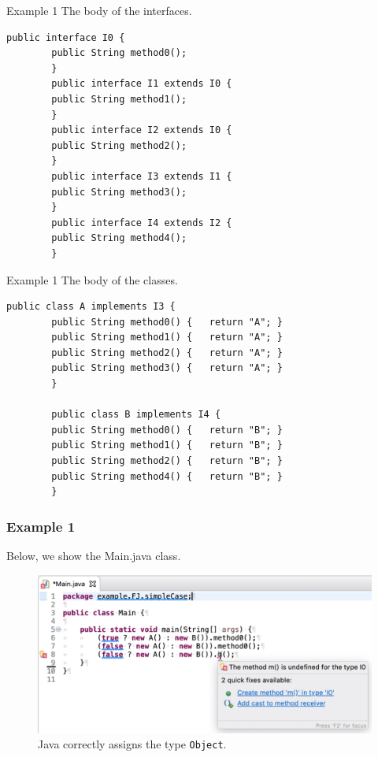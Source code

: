 \documentclass{beamer}
\begin{document}
\begin{frame}[fragile]{Example 1}
	\boldmath
	The body of the interfaces.	
	\begin{flushleft}
		\begin{lstlisting}[basicstyle=\scriptsize]
		public interface I0 {
		public String method0();
		}
		public interface I1 extends I0 {
		public String method1();
		}
		public interface I2 extends I0 {
		public String method2();
		}
		public interface I3 extends I1 {
		public String method3();
		}
		public interface I4 extends I2 {
		public String method4();
		}
		\end{lstlisting}
	\end{flushleft}
\end{frame}


\begin{frame}[fragile]{Example 1}
	\boldmath
	The body of the classes.	
	\begin{flushleft}
		\begin{lstlisting}[basicstyle=\scriptsize]
		public class A implements I3 {
		public String method0() {	return "A";	}
		public String method1() {	return "A";	}
		public String method2() {	return "A";	}
		public String method3() {	return "A"; }
		}
		
		public class B implements I4 {
		public String method0() {	return "B"; }
		public String method1() {	return "B"; }
		public String method2() {	return "B"; }
		public String method4() {	return "B"; }
		}
		\end{lstlisting}
	\end{flushleft}
\end{frame}


\begin{frame}
\frametitle{Example 1}
Below, we show the Main.java class.
\begin{figure}
\centering
\includegraphics[width=1\linewidth]{images/example-normal-type.png}
\caption{Java correctly assigns the type \texttt{Object}.}
\label{fig:mainres}
\end{figure}
\end{frame}
\end{document}
